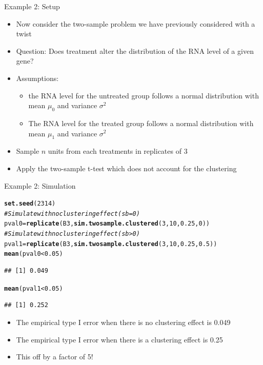 \documentclass[xcolor=x11names,compress]{beamer}\usepackage[]{graphicx}\usepackage[]{color}
\makeatletter
\newcommand{\hlnum}[1]{\textcolor[rgb]{0.686,0.059,0.569}{#1}}%
\newcommand{\hlcom}[1]{\textcolor[rgb]{0.678,0.584,0.686}{\textit{#1}}}%
\newcommand{\hlopt}[1]{\textcolor[rgb]{0,0,0}{#1}}%
\newcommand{\hlstd}[1]{\textcolor[rgb]{0.345,0.345,0.345}{#1}}%
\newcommand{\hlkwb}[1]{\textcolor[rgb]{0.69,0.353,0.396}{#1}}%
\newcommand{\hlkwd}[1]{\textcolor[rgb]{0.737,0.353,0.396}{\textbf{#1}}}%
\newenvironment{kframe}{%
 \def\at@end@of@kframe{}%
 \ifinner\ifhmode%
  \def\at@end@of@kframe{\end{minipage}}%
  \begin{minipage}{\columnwidth}%
 \fi\fi%
 \def\FrameCommand##1{\hskip\@totalleftmargin \hskip-\fboxsep
 \colorbox{shadecolor}{##1}\hskip-\fboxsep
     \hskip-\linewidth \hskip-\@totalleftmargin \hskip\columnwidth}%
 \MakeFramed {\advance\hsize-\width
   \@totalleftmargin\z@ \linewidth\hsize
   \@setminipage}}%
 {\par\unskip\endMakeFramed%
 \at@end@of@kframe}
\newenvironment{knitrout}{}{} %
\makeatother
\begin{document}
\begin{frame}{Example 2: Setup}
  \begin{itemize}
  \item Now consider the two-sample problem we have previously considered
        with a twist
  \item Question: Does treatment alter the distribution of the RNA level of a given gene?
  \item Assumptions:
    \begin{itemize}
    \item the RNA level for the untreated group follows a normal distribution with mean $\mu_0$ and
        variance $\sigma^2$
     \item The RNA level for the treated group follows a normal distribution with mean $\mu_1$ and
        variance $\sigma^2$
    \end{itemize}
 \item Sample $n$ units from each treatments in replicates of 3
 \item Apply the two-sample t-test which does not account for the clustering
  \end{itemize}
\end{frame}



\begin{frame}[fragile]{Example 2: Simulation}


\begin{knitrout}\tiny
{}\color{fgcolor}\begin{kframe}
\begin{alltt}
\hlkwd{set.seed}\hlstd{(}\hlnum{2314}\hlstd{)}
\hlcom{# Simulate with no clustering effect (sb=0)}
\hlstd{pval0}\hlkwb{=}\hlkwd{replicate}\hlstd{(B3,}\hlkwd{sim.twosample.clustered}\hlstd{(}\hlnum{3}\hlstd{,}\hlnum{10}\hlstd{,}\hlnum{0.25}\hlstd{,}\hlnum{0}\hlstd{))}
\hlcom{# Simulate with no clustering effect (sb>0)}
\hlstd{pval1}\hlkwb{=}\hlkwd{replicate}\hlstd{(B3,}\hlkwd{sim.twosample.clustered}\hlstd{(}\hlnum{3}\hlstd{,}\hlnum{10}\hlstd{,}\hlnum{0.25}\hlstd{,}\hlnum{0.5}\hlstd{))}
\hlkwd{mean}\hlstd{(pval0}\hlopt{<}\hlnum{0.05}\hlstd{)}
\end{alltt}
\begin{verbatim}
## [1] 0.049
\end{verbatim}
\begin{alltt}
\hlkwd{mean}\hlstd{(pval1}\hlopt{<}\hlnum{0.05}\hlstd{)}
\end{alltt}
\begin{verbatim}
## [1] 0.252
\end{verbatim}
\end{kframe}
\end{knitrout}
\begin{itemize}
\item The empirical type I error when there is no clustering
      effect is 0.049
\item The empirical type I error when there is a clustering effect is
      0.25
\item This off by a factor of 5!
\end{itemize}
\end{frame}
\end{document}
